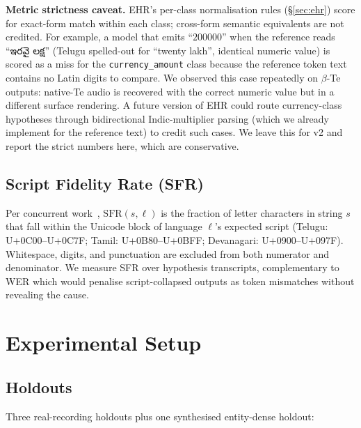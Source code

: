 \documentclass[conference,a4paper]{IEEEtran}
\begin{document}
\textbf{Metric strictness caveat.} EHR's per-class normalisation rules (\S\ref{sec:ehr}) score for exact-form match within each class; cross-form semantic equivalents are not credited. For example, a model that emits ``$200000$'' when the reference reads ``{\telugufont ఇరవై లక్ష}'' (Telugu spelled-out for ``twenty lakh'', identical numeric value) is scored as a miss for the \texttt{currency\_amount} class because the reference token text contains no Latin digits to compare. We observed this case repeatedly on $\beta$-Te outputs: native-Te audio is recovered with the correct numeric value but in a different surface rendering. A future version of EHR could route currency-class hypotheses through bidirectional Indic-multiplier parsing (which we already implement for the reference text) to credit such cases. We leave this for v2 and report the strict numbers here, which are conservative.

\subsection{Script Fidelity Rate (SFR)}\label{sec:sfr}

Per concurrent work~\cite{script_collapse_2026}, $\text{SFR}(s, \ell)$ is the fraction of letter characters in string $s$ that fall within the Unicode block of language $\ell$'s expected script (Telugu: U+0C00--U+0C7F; Tamil: U+0B80--U+0BFF; Devanagari: U+0900--U+097F). Whitespace, digits, and punctuation are excluded from both numerator and denominator. We measure SFR over hypothesis transcripts, complementary to WER which would penalise script-collapsed outputs as token mismatches without revealing the cause.

\section{Experimental Setup}\label{sec:experiments}

\subsection{Holdouts}

Three real-recording holdouts plus one synthesised entity-dense holdout:
\end{document}

